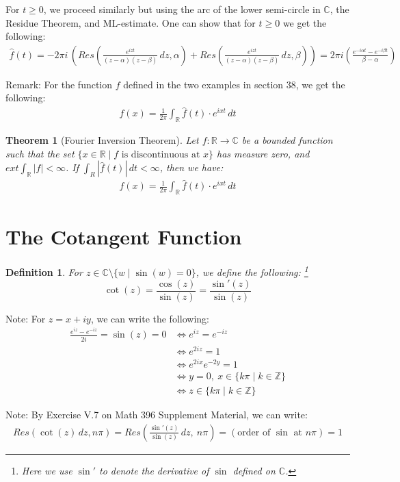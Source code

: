 \documentclass[11pt,oneside]{book}
\theoremstyle{break}
\theoremstyle{break}
\newtheorem{thm}{Theorem}[section]
\newtheorem{defn}{Definition}[corL]
\newcommand{\R}{\mathbb{R}}
\newcommand{\Z}{\mathbb{Z}}
\newcommand{\Complex}{\mathbb{C}}
\newcommand{\note}{\color{red}Note: \color{black}}
\newcommand{\remark}{\color{blue}Remark: \color{black}}
\begin{document}
For $t\geq 0$, we proceed similarly but using the arc of the lower semi-circle in $\Complex$, the Residue Theorem, and ML-estimate. One can show that for $t \geq 0$ we get the following:
\begin{align*}
\hat{f}(t) = -2\pi i\, \left(Res\left(\frac{e^{iz t}}{(z-\alpha)(z-\beta)}\, dz, \alpha\right) + Res\left(\frac{e^{iz t}}{(z-\alpha)(z-\beta)}\, dz, \beta\right)\right) = 2\pi i \left( \frac{e^{-i\alpha t} - e^{-i\beta t}}{\beta -\alpha}\right)
\end{align*}

\hfill\break
\remark For the function $f$ defined in the two examples in section 38, we get the following:  
\begin{align*}
f(x) = \frac{1}{2\pi} \int_{\R} \hat{f}(t)\cdot e^{ixt}\, dt
\end{align*}

\begin{thm}[Fourier Inversion Theorem]
Let $f:\R \to \Complex$ be a bounded function such that the set $\{x \in \R \mid f\text{ is discontinuous at }x\}$ has measure zero, and $ext \int_{\R}|f| < \infty$. If $\int_R |\hat{f}(t)|\, dt < \infty$, then we have: \begin{align*}
f(x) = \frac{1}{2\pi} \int_{\R} \hat{f}(t)\cdot e^{ixt}\, dt
\end{align*}
\end{thm}

\newpage
\section[The Cotangent Function]{\color{red}The Cotangent Function\color{black}}
\begin{defn}
For $z \in \Complex \setminus \{w \mid \sin(w) = 0\}$, we define the following: \footnote{Here we use $\sin'$ to denote the derivative of $\sin$ defined on $\Complex$.}
$$\cot(z) = \frac{\cos(z)}{\sin(z)} = \frac{\sin'(z)}{\sin(z)}$$
\end{defn}
\note For $z = x+iy$, we can write the following:
\begin{align*}
\frac{e^{iz}-e^{-iz}}{2i} = \sin(z) = 0 &\iff e^{iz} = e^{-iz}\\
&\iff e^{2iz } = 1\\
&\iff e^{2ix}e^{-2y} = 1\\
&\iff y=0,\ x \in \{k\pi\mid k\in \Z\}\\
&\iff z \in \{k\pi\mid k\in \Z\}
\end{align*}

\note By Exercise V.7 on Math 396 Supplement Material, we can write:
\begin{align*}
Res\left( \cot(z) \, dz , n\pi\right) = Res\left( \frac{\sin'(z)}{\sin(z)}\, dz , \ n\pi\right) = (\text{order of }\sin \text{ at }n\pi) = 1
\end{align*}
\end{document}
